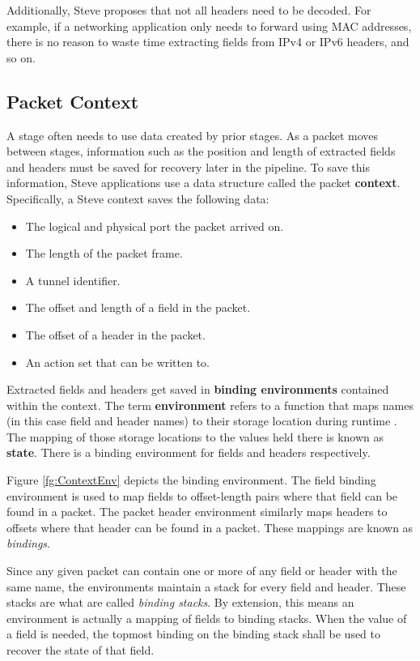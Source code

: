 Additionally, Steve proposes that not all headers need to be decoded. For example, if a networking application only needs to forward using MAC addresses, there is no reason to waste time extracting fields from IPv4 or IPv6 headers, and so on.

\subsection{Packet Context} \label{context_desc}

A stage often needs to use data created by prior stages. As a packet moves between stages, information such as the position and length of extracted fields and headers must be saved for recovery later in the pipeline. To save this information, Steve applications use a data structure called the packet \textbf{context}. Specifically, a Steve context saves the following data:

\begin{itemize}
\item The logical and physical port the packet arrived on.
\item The length of the packet frame.
\item A tunnel identifier.
\item The offset and length of a field in the packet.
\item The offset of a header in the packet.
\item An action set that can be written to.
\end{itemize}

Extracted fields and headers get saved in \textbf{binding environments} contained within the context. The term \textbf{environment} refers to a function that maps names (in this case field and header names) to their storage location during runtime \cite{compilers1}. The mapping of those storage locations to the values held there is known as \textbf{state}. There is a binding environment for fields and headers respectively.

Figure \ref{fg:ContextEnv} depicts the binding environment. The field binding environment is used to map fields to offset-length pairs where that field can be found in a packet. The packet header environment similarly maps headers to offsets where that header can be found in a packet. These mappings are known as \textit{bindings}.

Since any given packet can contain one or more of any field or header with the same name, the environments maintain a stack for every field and header. These stacks are what are called \textit{binding stacks}. By extension, this means an environment is actually a mapping of fields to binding stacks. When the value of a field is needed, the topmost binding on the binding stack shall be used to recover the state of that field.

